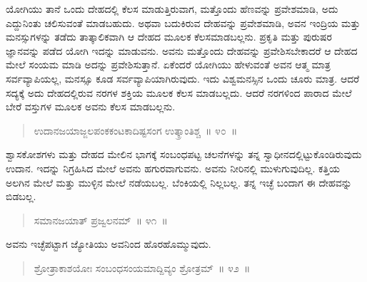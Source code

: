 \vspace{0.1cm}

ಯೋಗಿಯು ತಾನೆ ಒಂದು ದೇಹದಲ್ಲಿ ಕೆಲಸ ಮಾಡುತ್ತಿರುವಾಗ, ಮತ್ತೊಂದು ಹೆಣವನ್ನು ಪ್ರವೇಶಮಾಡಿ, ಅದು ಎದ್ದುನಿಂತು ಚಲಿಸುವಂತೆ ಮಾಡಬಹುದು. ಅಥವಾ ಬದುಕಿರುವ ದೇಹವನ್ನು ಪ್ರವೇಶಮಾಡಿ, ಅವನ ಇಂದ್ರಿಯ ಮತ್ತು ಮನಸ್ಸುಗಳನ್ನು ತಡೆದು ತಾತ್ಕಾಲಿಕವಾಗಿ ಆ ದೇಹದ ಮೂಲಕ ಕೆಲಸಮಾಡಬಲ್ಲನು. ಪ್ರಕೃತಿ ಮತ್ತು ಪುರುಷರ ಜ್ಞಾನವನ್ನು ಪಡೆದ ಯೋಗಿ ಇದನ್ನು ಮಾಡುವನು. ಅವನು ಮತ್ತೊಂದು ದೇಹವನ್ನು ಪ್ರವೇಶಿಸಬೇಕಾದರೆ ಆ ದೇಹದ ಮೇಲೆ ಸಂಯಮ ಮಾಡಿ ಅದನ್ನು ಪ್ರವೇಶಿಸುತ್ತಾನೆ. ಏಕೆಂದರೆ ಯೋಗಿಯು ಹೇಳುವಂತೆ ಅವನ ಆತ್ಮ ಮಾತ್ರ ಸರ್ವವ್ಯಾಪಿಯಲ್ಲ, ಮನಸ್ಸೂ ಕೂಡ ಸರ್ವವ್ಯಾಪಿಯಾಗಿರುವುದು. ಇದು ವಿಶ್ವಮನಸ್ಸಿನ ಒಂದು ಚೂರು ಮಾತ್ರ. ಆದರೆ ಸದ್ಯಕ್ಕೆ ಅದು ದೇಹದಲ್ಲಿರುವ ನರಗಳ ಶಕ್ತಿಯ ಮೂಲಕ ಕೆಲಸ ಮಾಡಬಲ್ಲದು. ಆದರೆ ನರಗಳಿಂದ ಪಾರಾದ ಮೇಲೆ ಬೇರೆ ವಸ್ತುಗಳ ಮೂಲಕ ಅವನು ಕೆಲಸ ಮಾಡಬಲ್ಲನು. 


\newpage

\begin{verse}
ಉದಾನಜಯಾಜ್ಜಲಪಂಕಕಂಟಕಾದಿಷ್ಟಸಂಗ ಉತ್ಕ್ರಾಂತಿಶ್ಚ~॥ ೪೦~॥
\end{verse}

\vspace{-0.4cm}


\vspace{0.1cm}

ಶ್ವಾಸಕೋಶಗಳು ಮತ್ತು ದೇಹದ ಮೇಲಿನ ಭಾಗಕ್ಕೆ ಸಂಬಂಧಪಟ್ಟ ಚಲನೆಗಳನ್ನು ತನ್ನ ಸ್ವಾಧೀನದಲ್ಲಿಟ್ಟುಕೊಂಡಿರುವುದು ಉದಾನ. ಇದನ್ನು ನಿಗ್ರಹಿಸಿದ ಮೇಲೆ ಅವನು ಹಗುರವಾಗುವನು. ಅವನು ನೀರಿನಲ್ಲಿ ಮುಳುಗುವುದಿಲ್ಲ. ಕತ್ತಿಯ ಅಲಗಿನ ಮೇಲೆ ಮತ್ತು ಮುಳ್ಳಿನ ಮೇಲೆ ನಡೆಯಬಲ್ಲ. ಬೆಂಕಿಯಲ್ಲಿ ನಿಲ್ಲಬಲ್ಲ. ತನ್ನ ಇಚ್ಛೆ ಬಂದಾಗ ಈ ದೇಹವನ್ನು ಬಿಡಬಲ್ಲ. 

\vspace{-0.3cm}

\begin{verse}
ಸಮಾನಜಯಾತ್​ ಪ್ರಜ್ವಲನಮ್​~॥ ೪೧~॥
\end{verse}

\vspace{-0.4cm}


\vspace{0.1cm}

ಅವನು ಇಚ್ಛೆಪಟ್ಟಾಗ ಜ್ಯೋತಿಯು ಅವನಿಂದ ಹೊರಹೊಮ್ಮುವುದು. 

\vspace{-0.2cm}

\begin{verse}
ಶ್ರೋತ್ರಾಕಾಶಯೋಃ ಸಂಬಂಧಸಂಯಮಾದ್ದಿವ್ಯಂ ಶ್ರೋತ್ರಮ್​~॥ ೪೨~॥
\end{verse}

